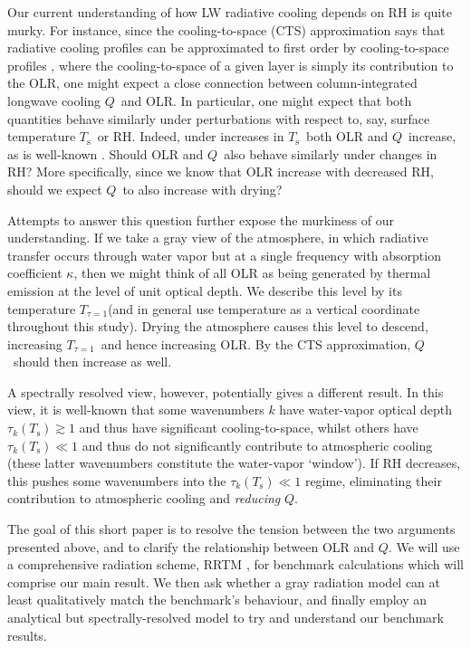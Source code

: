 \documentclass[10pt]{article}
\newcommand{\QLW}{\ensuremath{Q}}
\newcommand{\tauk}{\ensuremath{\tau_k}}
\newcommand{\Tone}{\ensuremath{T_{\tau=1}}}
\newcommand{\Ts}{\ensuremath{T_\mathrm{s}}}
\begin{document}
Our current understanding of how LW radiative cooling depends on RH is quite murky.  For instance, since the cooling-to-space (CTS) approximation says that radiative cooling profiles can be approximated to first order by cooling-to-space profiles \citep[e.g]{jeevanjee2016,clough1992,rodgers1966}, where the cooling-to-space of a given layer is simply its contribution to the OLR, one might expect a close connection between column-integrated longwave cooling \QLW\ and OLR. In particular, one might expect that both quantities behave similarly under perturbations with respect to, say, surface temperature \Ts\ or RH. Indeed, under increases in \Ts\  both OLR and \QLW\ increase, as is well-known \citep{jeevanjee2016,pendergrass2014,ogorman2012,stephens2008}. Should OLR and \QLW\  also behave similarly under changes in RH? More specifically, since we know that  OLR increase with decreased RH,  should we expect \QLW\  to also increase with drying?

Attempts to answer this question further expose the murkiness of our understanding. If we take a gray view of the atmosphere, in which radiative transfer occurs through water vapor but at a single frequency with absorption coefficient $\kappa$, then we might think of all OLR as being generated by thermal emission at the level of unit optical depth. We describe this level by its temperature \Tone  (and in general use temperature as a vertical coordinate throughout this study).  Drying the atmosphere causes this  level to descend, increasing \Tone\ and hence increasing OLR. By the CTS approximation, \QLW\ should then increase as well.

A spectrally resolved view, however, potentially gives a different result. In this view, it is well-known that some wavenumbers $k$ have water-vapor optical depth  $\tauk(\Ts) \gtrsim 1$ and thus have significant cooling-to-space, whilst others have $\tauk(\Ts) \ll 1$ and thus do not significantly contribute to atmospheric cooling (these latter wavenumbers constitute the water-vapor `window'). If RH decreases, this pushes some  wavenumbers into the $\tauk(\Ts) \ll 1$ regime, eliminating their contribution to atmospheric cooling and \emph{reducing} \QLW.

The goal of this short paper is to resolve the tension between the two arguments presented above,  and to clarify the relationship between OLR and \QLW. We will use a comprehensive radiation scheme, RRTM \citep{mlawer1997}, for benchmark calculations which will comprise our main result. We then ask whether a gray radiation model can at least qualitatively match the benchmark's behaviour, and finally employ an analytical but spectrally-resolved model to try and understand our benchmark results. 
\end{document}
